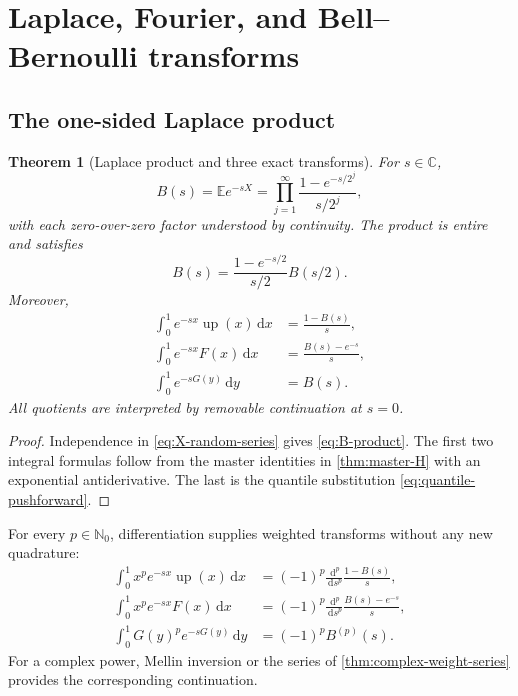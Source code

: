 \documentclass[11pt,oneside]{article}
\newtheorem{theorem}{Theorem}[section]
\theoremstyle{definition}
\theoremstyle{remark}
\newcommand{\C}{\mathbb C}
\newcommand{\N}{\mathbb N}
\newcommand{\E}{\mathbb E}
\newcommand{\dd}{\,\mathrm d}
\newcommand{\upf}{\operatorname{up}}
\begin{document}
\section{Laplace, Fourier, and Bell--Bernoulli transforms}

\subsection{The one-sided Laplace product}

\begin{theorem}[Laplace product and three exact transforms]\label{thm:laplace-product}
For $s\in\C$,
\begin{equation}\label{eq:B-product}
 B(s)=\E e^{-sX}
 =\prod_{j=1}^{\infty}
 \frac{1-e^{-s/2^j}}{s/2^j},
\end{equation}
with each zero-over-zero factor understood by continuity.  The product is entire and satisfies
\begin{equation}\label{eq:B-dilation}
 B(s)=\frac{1-e^{-s/2}}{s/2}B(s/2).
\end{equation}
Moreover,
\begin{align}
 \int_0^1e^{-sx}\upf(x)\dd x
 &=\frac{1-B(s)}s,\label{eq:laplace-up-one-sided}\\
 \int_0^1e^{-sx}F(x)\dd x
 &=\frac{B(s)-e^{-s}}s,\label{eq:laplace-F-one-sided}\\
 \int_0^1e^{-sG(y)}\dd y
 &=B(s).\label{eq:laplace-inverse}
\end{align}
All quotients are interpreted by removable continuation at $s=0$.
\end{theorem}

\begin{proof}
Independence in \eqref{eq:X-random-series} gives \eqref{eq:B-product}.  The first two integral formulas follow from the master identities in \cref{thm:master-H} with an exponential antiderivative.  The last is the quantile substitution \eqref{eq:quantile-pushforward}.
\end{proof}

For every $p\in\N_0$, differentiation supplies weighted transforms without any new quadrature:
\begin{align}
 \int_0^1x^pe^{-sx}\upf(x)\dd x
 &=(-1)^p\frac{\dd^p}{\dd s^p}\frac{1-B(s)}s,\label{eq:weighted-laplace-up}\\
 \int_0^1x^pe^{-sx}F(x)\dd x
 &=(-1)^p\frac{\dd^p}{\dd s^p}\frac{B(s)-e^{-s}}s,\label{eq:weighted-laplace-F}\\
 \int_0^1G(y)^pe^{-sG(y)}\dd y
 &=(-1)^pB^{(p)}(s).\label{eq:weighted-laplace-G}
\end{align}
For a complex power, Mellin inversion or the series of \cref{thm:complex-weight-series} provides the corresponding continuation.
\end{document}
